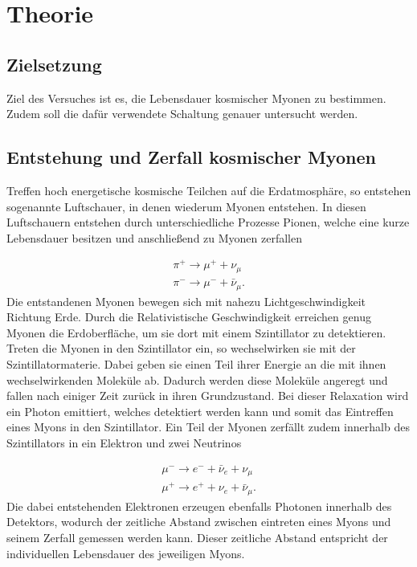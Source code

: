 \section{Theorie}
\label{sec:Theorie}

\subsection{Zielsetzung}
Ziel des Versuches ist es, die Lebensdauer kosmischer Myonen zu bestimmen. 
Zudem soll die dafür verwendete Schaltung genauer untersucht werden.


\subsection{Entstehung und Zerfall kosmischer Myonen}
Treffen hoch energetische kosmische Teilchen auf die Erdatmosphäre, so entstehen sogenannte Luftschauer, in denen wiederum Myonen entstehen.
In diesen Luftschauern entstehen durch unterschiedliche Prozesse Pionen, welche eine kurze Lebensdauer besitzen und anschließend zu Myonen zerfallen

\begin{align*}
    \pi^+ \rightarrow \mu^+ + \nu_\mu \\
    \pi^- \rightarrow \mu^- + \bar \nu_\mu.
\end{align*}
Die entstandenen Myonen bewegen sich mit nahezu Lichtgeschwindigkeit Richtung Erde. 
Durch die Relativistische Geschwindigkeit erreichen genug Myonen die Erdoberfläche, um sie dort mit einem Szintillator zu detektieren.
Treten die Myonen in den Szintillator ein, so wechselwirken sie mit der Szintillatormaterie.
Dabei geben sie einen Teil ihrer Energie an die mit ihnen wechselwirkenden Moleküle ab.
Dadurch werden diese Moleküle angeregt und fallen nach einiger Zeit zurück in ihren Grundzustand.
Bei dieser Relaxation wird ein Photon emittiert, welches detektiert werden kann und somit das Eintreffen eines Myons in den Szintillator.
Ein Teil der Myonen zerfällt zudem innerhalb des Szintillators in ein Elektron und zwei Neutrinos

\begin{align*}
    \mu^- \rightarrow e^- + \bar \nu_e + \nu_\mu \\
    \mu^+ \rightarrow e^+ + \nu_e + \bar \nu_\mu.
\end{align*}
Die dabei entstehenden Elektronen erzeugen ebenfalls Photonen innerhalb des Detektors, wodurch der zeitliche Abstand zwischen eintreten eines Myons und seinem Zerfall gemessen werden kann.
Dieser zeitliche Abstand entspricht der individuellen Lebensdauer des jeweiligen Myons.



